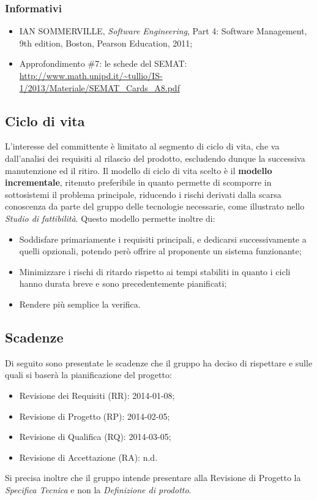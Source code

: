 		\subsubsection{Informativi}
		
		\begin{itemize}
		\item IAN SOMMERVILLE, \textit{Software Engineering}, Part 4: Software Management, 9th edition, Boston, Pearson Education, 2011;
		\item Approfondimento \#7: le schede del SEMAT:\\
			\url{http://www.math.unipd.it/~tullio/IS-1/2013/Materiale/SEMAT_Cards_A8.pdf}
		\end{itemize}
		
	\pagebreak
	\subsection{Ciclo di vita}
	L'interesse del committente è limitato al segmento di ciclo di vita, che va dall'analisi dei requisiti al rilascio del prodotto, escludendo dunque la successiva manutenzione ed il ritiro.
	Il modello di ciclo di vita scelto è il \textbf{modello incrementale}, ritenuto preferibile in quanto permette di scomporre in sottosistemi il problema principale, riducendo i rischi derivati dalla scarsa conoscenza da parte del gruppo delle tecnologie necessarie, come illustrato nello \textit{Studio di fattibilità}.
	Questo modello permette inoltre di:
	\begin{itemize}
	\item Soddisfare primariamente i requisiti principali, e dedicarsi successivamente a quelli opzionali, potendo però offrire al proponente un sistema funzionante;
	\item Minimizzare i rischi di ritardo rispetto ai tempi stabiliti in quanto i cicli hanno durata breve e sono precedentemente pianificati;
	\item Rendere più semplice la verifica.
	\end{itemize}
	\subsection{Scadenze}
	Di seguito sono presentate le scadenze che il gruppo ha deciso di rispettare e sulle quali si baserà la pianificazione del progetto:
	\begin{itemize}
	\item Revisione dei Requisiti (RR): 2014-01-08;
	\item Revisione di Progetto (RP): 2014-02-05;
	\item Revisione di Qualifica (RQ): 2014-03-05;
	\item Revisione di Accettazione (RA): n.d.
	\end{itemize}
	Si precisa inoltre che il gruppo intende presentare alla Revisione di Progetto la \textit{Specifica Tecnica} e non la \textit{Definizione di prodotto}.

